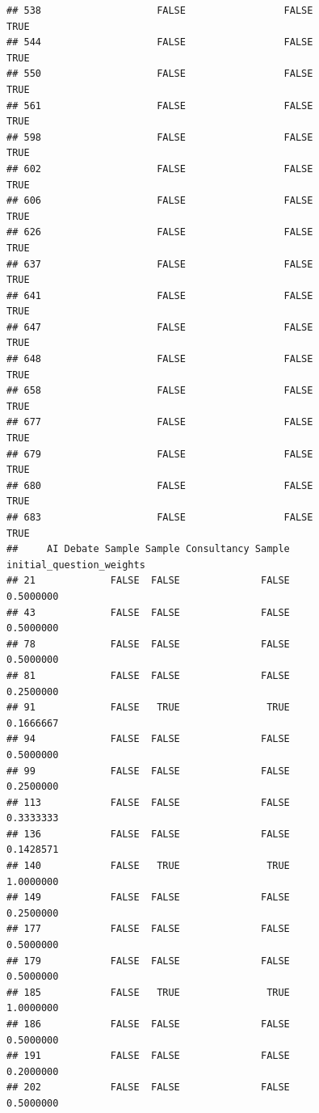 \documentclass[
]{article}
\begin{document}
\begin{verbatim}
## 538                    FALSE                 FALSE                TRUE
## 544                    FALSE                 FALSE                TRUE
## 550                    FALSE                 FALSE                TRUE
## 561                    FALSE                 FALSE                TRUE
## 598                    FALSE                 FALSE                TRUE
## 602                    FALSE                 FALSE                TRUE
## 606                    FALSE                 FALSE                TRUE
## 626                    FALSE                 FALSE                TRUE
## 637                    FALSE                 FALSE                TRUE
## 641                    FALSE                 FALSE                TRUE
## 647                    FALSE                 FALSE                TRUE
## 648                    FALSE                 FALSE                TRUE
## 658                    FALSE                 FALSE                TRUE
## 677                    FALSE                 FALSE                TRUE
## 679                    FALSE                 FALSE                TRUE
## 680                    FALSE                 FALSE                TRUE
## 683                    FALSE                 FALSE                TRUE
##     AI Debate Sample Sample Consultancy Sample initial_question_weights
## 21             FALSE  FALSE              FALSE                0.5000000
## 43             FALSE  FALSE              FALSE                0.5000000
## 78             FALSE  FALSE              FALSE                0.5000000
## 81             FALSE  FALSE              FALSE                0.2500000
## 91             FALSE   TRUE               TRUE                0.1666667
## 94             FALSE  FALSE              FALSE                0.5000000
## 99             FALSE  FALSE              FALSE                0.2500000
## 113            FALSE  FALSE              FALSE                0.3333333
## 136            FALSE  FALSE              FALSE                0.1428571
## 140            FALSE   TRUE               TRUE                1.0000000
## 149            FALSE  FALSE              FALSE                0.2500000
## 177            FALSE  FALSE              FALSE                0.5000000
## 179            FALSE  FALSE              FALSE                0.5000000
## 185            FALSE   TRUE               TRUE                1.0000000
## 186            FALSE  FALSE              FALSE                0.5000000
## 191            FALSE  FALSE              FALSE                0.2000000
## 202            FALSE  FALSE              FALSE                0.5000000

\end{verbatim}
\end{document}
